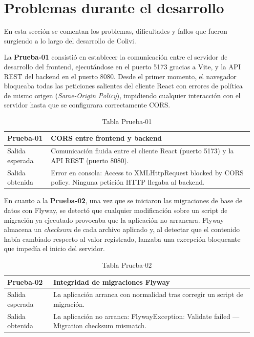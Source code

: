 \section{Problemas durante el desarrollo}
\label{sec:problemas_desarrollo}

En esta sección se comentan los problemas, dificultades y fallos que fueron surgiendo a lo largo del desarrollo de Colivi.

La \textbf{Prueba-01} consistió en establecer la comunicación entre el servidor de desarrollo del frontend, ejecutándose en el puerto 5173 gracias a Vite, y la API REST del backend en el puerto 8080. Desde el primer momento, el navegador bloqueaba todas las peticiones salientes del cliente React con errores de política de mismo origen (\emph{Same-Origin Policy}), impidiendo cualquier interacción con el servidor hasta que se configurara correctamente CORS.

\begin{table}[H]
\centering
\begin{tabular}{|p{}|p{}|}
\hline
\textbf{Prueba-01} & \textbf{CORS entre frontend y backend} \\ \hline
Salida esperada & Comunicación fluida entre el cliente React (puerto 5173) y la API REST (puerto 8080). \\ \hline
Salida obtenida & Error en consola: Access to XMLHttpRequest blocked by CORS policy. Ninguna petición HTTP llegaba al backend. \\ \hline
\end{tabular}
\caption{Tabla Prueba-01}
\label{tab:prueba01}
\end{table}

En cuanto a la \textbf{Prueba-02}, una vez que se iniciaron las migraciones de base de datos con Flyway, se detectó que cualquier modificación sobre un script de migración ya ejecutado provocaba que la aplicación no arrancara. Flyway almacena un \emph{checksum} de cada archivo aplicado y, al detectar que el contenido había cambiado respecto al valor registrado, lanzaba una excepción bloqueante que impedía el inicio del servidor.

\begin{table}[H]
\centering
\begin{tabular}{|p{}|p{}|}
\hline
\textbf{Prueba-02} & \textbf{Integridad de migraciones Flyway} \\ \hline
Salida esperada & La aplicación arranca con normalidad tras corregir un script de migración. \\ \hline
Salida obtenida & La aplicación no arranca: FlywayException: Validate failed — Migration checksum mismatch. \\ \hline
\end{tabular}
\caption{Tabla Prueba-02}
\label{tab:prueba02}
\end{table}

